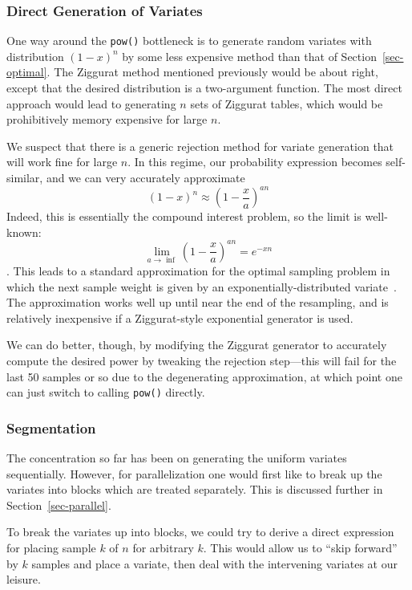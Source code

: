 \documentclass[12pt]{article}
\begin{document}
\subsubsection{Direct Generation of Variates}

  One way around the {\tt pow()} bottleneck is to generate
  random variates with distribution $(1 - x)^n$ by
  some less expensive method than that of
  Section~\ref{sec-optimal}.  The Ziggurat method mentioned
  previously would be about right, except that the desired
  distribution is a two-argument function.  The most direct
  approach would lead to generating $n$ sets of Ziggurat
  tables, which would be prohibitively memory expensive for
  large $n$.

  We suspect that there is a generic rejection method for
  variate generation that will work fine for large $n$. In
  this regime, our probability expression becomes
  self-similar, and we can very accurately approximate $$
    (1 - x)^n \approx \left(1 - \frac{x}{a}\right)^{an}
  $$
  Indeed, this is essentially the compound interest problem,
  so the limit is well-known: $$
  \lim_{a \rightarrow \inf}\left(1 - \frac{x}{a}\right)^{an}
  = e^{-xn}$$.  This leads to a standard approximation for
  the optimal sampling problem in which the next sample
  weight is given by an exponentially-distributed
  variate~\cite{carpenter}.  The approximation works well up until near the
  end of the resampling, and is relatively inexpensive if a
  Ziggurat-style exponential generator is used.

  We can do better, though, by modifying the Ziggurat
  generator to accurately compute the desired power by
  tweaking the rejection step---this will fail for the last
  50 samples or so due to the degenerating approximation, at
  which point one can just switch to calling {\tt pow()}
  directly.

\subsubsection{Segmentation}\label{sec-segment}

  The concentration so far has been on generating the uniform
  variates sequentially.  However, for parallelization one
  would first like to break up the variates into blocks which
  are treated separately.  This is discussed further in
  Section~\ref{sec-parallel}.

  To break the variates up into blocks, we could try to
  derive a direct expression for placing sample $k$ of $n$
  for arbitrary $k$.  This would allow us to ``skip forward''
  by $k$ samples and place a variate, then deal with the
  intervening variates at our leisure.
\end{document}
